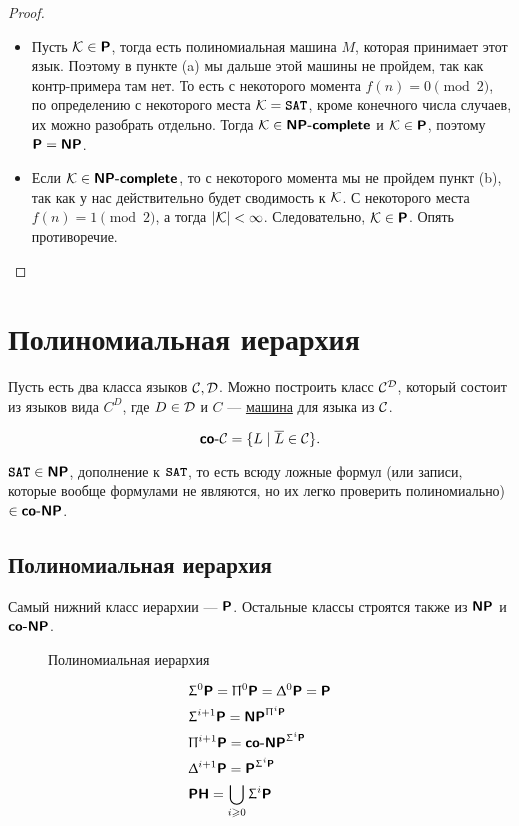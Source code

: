\begin{proof}
	\begin{itemize}
		\item
	Пусть $ \K \in \P$, тогда  есть полиномиальная машина $ M$, которая принимает этот язык. Поэтому в пункте (a) мы дальше этой машины не пройдем, так как  контр-примера там нет. То есть с некоторого момента $ f(n) = 0 \pmod 2$, по определению с некоторого места   $ \K = \SAT$, кроме конечного числа случаев, их можно разобрать отдельно. 
	Тогда $ \K \in \NPcomp $ и $ \K \in \P$, поэтому $ \P = \NP$.
\item Если $ \K \in \NPcomp$, то с некоторого момента мы не пройдем пункт (b), так как у нас действительно будет сводимость к $ \K$.
	С некоторого места  $ f(n) = 1 \pmod 2$, а тогда  $ \lvert \K \rvert < \infty$. Следовательно, $ \K \in \P$. Опять противоречие. 
	\end{itemize}
\end{proof}

\section{Полиномиальная иерархия}
\begin{name}
Пусть есть два класса языков $ \Cclass, \Dclass$. Можно построить класс $ \Cclass ^{\Dclass}$, который состоит из  языков вида $ C^{D} $, где $ D \in \Dclass$ и $ C$ --- \underline{машина} для языка из $ \Cclass$.
\end{name}
\begin{defn}
    \[
    \coC = \{L \mid \overline{L} \in \Cclass\}
    .\] 
\end{defn}
\begin{ex}
	$ \SAT \in \NP$, дополнение к $ \SAT$, то есть всюду ложные формул (или записи, которые вообще формулами не являются, но их легко проверить полиномиально) $ \in \coNP$.
\end{ex}

\subsection{Полиномиальная иерархия}
Самый нижний класс иерархии --- $ \P$. Остальные классы строятся также из  $ \NP$ и $ \coNP$.
\begin{figure}[b!]
    \centering
    \caption{Полиномиальная иерархия}
    \label{fig:hierarchy}
\end{figure}
\[
\begin{aligned}
	&\SIGMA ^{0}\P = \PI ^{0}\P = \DELTA ^{0} \P = \P \\
	& \SIGMA ^{i+1} \P = \NP^{\PI^{i}\P} \\
	& \PI^{i+1}\P = \coNP^{\SIGMA ^{i}\P}\\
	& \DELTA ^{i+1}\P = \P^{\SIGMA ^{i}\P} \\
	& \PH = \bigcup_{i \ge 0} \SIGMA ^{i} \P
\end{aligned}\index{\PH}\index{$ \SIGMA^{i}\P$}\index{$ \PI^i\P$ }\index{$ \Delta ^{i}\P$ }
\]

